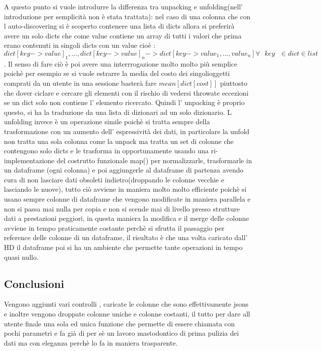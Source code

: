 \documentclass[11pt]{article}
\begin{document}
A questo punto si vuole introdurre la differenza tra unpacking e
unfolding(nell' introduzione per semplicità non è stata trattata): nel
caso di una colonna che con l auto-discovering si è scoperto contenere
una lista di dicts allora si preferirà avere un solo dicts che come
value contiene un array di tutti i valori che prima erano contenuti in
singoli dicts con un value cioè :
\(dict[key->value]_1,...,dict[key->value]_n -> dict[key->value_1,...,value_n] \forall\text{ } key\text{ } \in dict \in list\).
Il senso di fare ciò è poi avere una interrrogazione molto molto più
semplice poichè per esempio se si vuole estrarre la media del costo dei
singolioggetti comprati da un utente in una sessione basterà fare
\(mean[dict[cost]]\) piuttosto che dover ciclare e cercare gli elementi
con il rischio di vedersi throwate eccezioni se un dict solo non
contiene l' elemento ricercato. Quindi l' unpacking è proprio questo, si
ha la traduzione da una lista di dizionari ad un solo dizionario. L
unfolding invece è un operazione simile poichè si tratta sempre della
trasformazione con un aumento dell' espressività dei dati, in
particolare la unfold non tratta una sola colonna come la unpack ma
tratta un set di colonne che contengono solo dicts e le trasforma in
opportunamente usando una ri-implementazione del costrutto funzionale
map() per normalizzarle, trasformarle in un dataframe (ogni colonna) e
poi aggiungerle al dataframe di partenza avendo cura di non lasciare
dati obsoleti indietro(droppando le colonne vecchie e lasciando le
nuove), tutto ciò avviene in maniera molto molto efficiente poichè si
usano sempre colonne di dataframe che vengono modificate in maniera
parallela e non si passa mai nulla per copia e non si scende mai di
livello presso strutture dati a prestazioni peggiori, in questa maniera
la modifica e il merge delle colonne avviene in tempo praticamente
costante perchè si sfrutta il passaggio per reference delle colonne di
un dataframe, il risultato è che una volta caricato dall' HD il
dataframe poi si ha un ambiente che permette tante operazioni in tempo
quasi nullo.

\subsection{Conclusioni}\label{conclusioni}

Vengono aggiunti vari controlli , caricate le colonne che sono
effettivamente jsons e inoltre vengono droppate colonne uniche e colonne
costanti, il tutto per dare all utente finale una sola ed unica funzione
che permette di essere chiamata con pochi parametri e fa già di per sè
un lavoro mastodontico di prima pulizia dei dati ma con eleganza perchè
lo fa in maniera trasparente.
\end{document}
